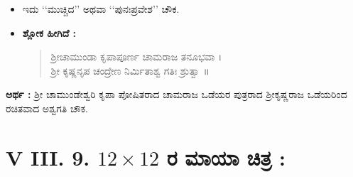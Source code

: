 \newpage

\begin{itemize}
	\item ಇದು ‘‘ಮುಚ್ಚಿದ’’ ಅಥವಾ ‘‘ಪುನಃಪ್ರವೇಶ’’ ಚೌಕ.
	\item \textbf{ಶ್ಲೋಕ ಹೀಗಿದೆ :}
	\begin{quote}
	ಶ್ರೀಚಾಮುಂಡಾ ಕೃಪಾಪೂರ್ಣ ಚಾಮರಾಜ ತನೂಭವಾ ।\\
	ಶ್ರೀ ಕೃಷ್ಣನೃಪ ಚಂದ್ರೇಣ ನಿರ್ಮಿತಾಶ್ವ ಗತಿಃ ಶ್ರುತ್ವಾ ॥
	\end{quote}
\end{itemize}

\textbf{ಅರ್ಥ :} ಶ್ರೀ ಚಾಮುಂಡೇಶ್ವರಿ ಕೃಪಾ ಪೋಷಿತರಾದ ಚಾಮರಾಜ ಒಡೆಯರ ಪುತ್ರರಾದ ಶ್ರೀಕೃಷ್ಣರಾಜ ಒಡೆಯರಿಂದ ರಚಿತವಾದ ಅಶ್ವಗತಿ ಚೌಕ.

\section*{V III. 9. $12 \times 12$ ರ ಮಾಯಾ ಚಿತ್ರ :}
